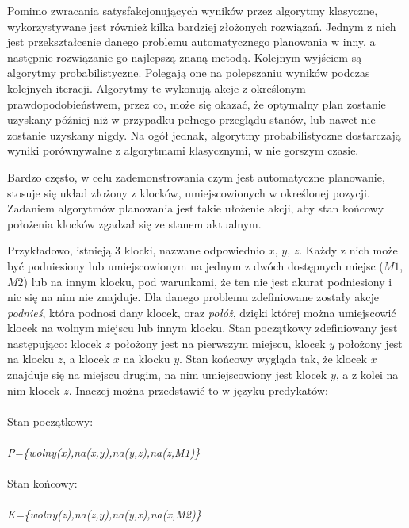 Pomimo zwracania satysfakcjonujących wyników przez algorytmy klasyczne, wykorzystywane jest również kilka bardziej złożonych rozwiązań. Jednym z nich jest przekształcenie danego problemu automatycznego planowania w inny, a następnie  rozwiązanie go najlepszą znaną metodą. Kolejnym wyjściem są algorytmy probabilistyczne. Polegają one na polepszaniu wyników podczas kolejnych iteracji. Algorytmy te wykonują akcje z określonym prawdopodobieństwem, przez co, może się okazać, że optymalny plan zostanie uzyskany później niż w przypadku pełnego przeglądu stanów, lub nawet nie zostanie uzyskany nigdy. Na ogół jednak, algorytmy probabilistyczne dostarczają wyniki porównywalne z algorytmami klasycznymi, w nie gorszym czasie.

Bardzo często, w celu zademonstrowania czym jest automatyczne planowanie, stosuje się układ złożony z klocków, umiejscowionych w określonej pozycji. Zadaniem algorytmów planowania jest takie ułożenie akcji, aby stan końcowy położenia klocków zgadzał się ze stanem aktualnym. 

Przykładowo, istnieją 3 klocki, nazwane odpowiednio $x$, $y$, $z$. Każdy z nich może być podniesiony lub umiejscowionym na jednym z dwóch dostępnych miejsc ($M1$, $M2$) lub na innym klocku, pod warunkami, że ten nie jest akurat podniesiony i nic się na nim nie znajduje. Dla danego problemu zdefiniowane zostały akcje \emph{podnieś}, która podnosi dany klocek, oraz \emph{połóż}, dzięki której można umiejscowić klocek na wolnym miejscu lub innym klocku. Stan początkowy zdefiniowany jest następująco: klocek $z$ położony jest na pierwszym miejscu, klocek $y$ położony jest na klocku $z$, a klocek $x$ na klocku $y$. Stan końcowy wygląda tak, że klocek $x$ znajduje się na miejscu drugim, na nim umiejscowiony jest klocek $y$, a z kolei na nim klocek $z$. Inaczej można przedstawić to w języku predykatów:
\\\\
Stan początkowy:
\\\\
\textit{P=\{wolny(x),na(x,y),na(y,z),na(z,M1)\}}
\\\\
Stan końcowy:
\\\\
\textit{K=\{wolny(z),na(z,y),na(y,x),na(x,M2)\}}

